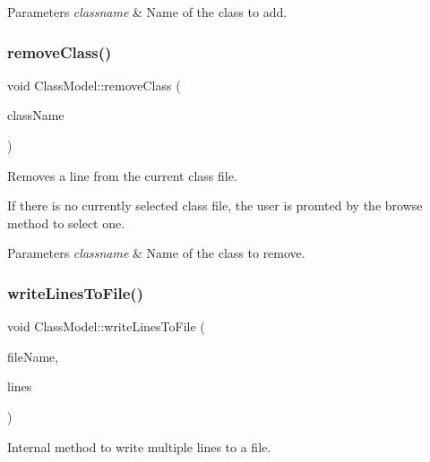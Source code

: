 \begin{DoxyParams}{Parameters}
{\em classname} & Name of the class to add. \\
\hline
\end{DoxyParams}
\mbox{\label{classClassModel_afe2266d404da4bab25bf193212fed198}} 
\subsubsection{\texorpdfstring{remove\+Class()}{removeClass()}}
{\footnotesize\ttfamily void Class\+Model\+::remove\+Class (\begin{DoxyParamCaption}\item[{const Q\+String \&}]{class\+Name }\end{DoxyParamCaption})}



Removes a line from the current class file. 

If there is no currently selected class file, the user is promted by the browse method to select one.


\begin{DoxyParams}{Parameters}
{\em classname} & Name of the class to remove. \\
\hline
\end{DoxyParams}
\mbox{\label{classClassModel_af78dad5b5b8f214b5067fd1dd629b594}} 
\subsubsection{\texorpdfstring{write\+Lines\+To\+File()}{writeLinesToFile()}}
{\footnotesize\ttfamily void Class\+Model\+::write\+Lines\+To\+File (\begin{DoxyParamCaption}\item[{const Q\+String \&}]{file\+Name,  }\item[{const Q\+String\+List \&}]{lines }\end{DoxyParamCaption})\hspace{0.3cm}{\ttfamily [private]}}



Internal method to write multiple lines to a file. 


